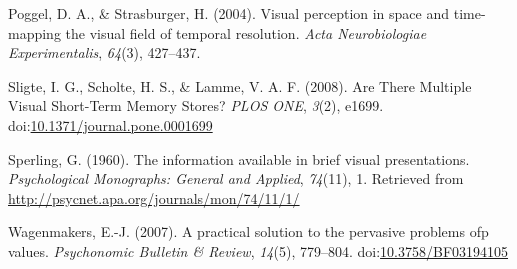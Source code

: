 \documentclass[,man]{apa6}
\theoremstyle{definition}
\theoremstyle{definition}
\theoremstyle{definition}
\theoremstyle{remark}
\begin{document}
\hypertarget{ref-poggel_visual_2004}{}
Poggel, D. A., \& Strasburger, H. (2004). Visual perception in space and
time-mapping the visual field of temporal resolution. \emph{Acta
Neurobiologiae Experimentalis}, \emph{64}(3), 427--437.

\hypertarget{ref-sligte_are_2008}{}
Sligte, I. G., Scholte, H. S., \& Lamme, V. A. F. (2008). Are There
Multiple Visual Short-Term Memory Stores? \emph{PLOS ONE}, \emph{3}(2),
e1699.
doi:\href{https://doi.org/10.1371/journal.pone.0001699}{10.1371/journal.pone.0001699}

\hypertarget{ref-sperling_information_1960}{}
Sperling, G. (1960). The information available in brief visual
presentations. \emph{Psychological Monographs: General and Applied},
\emph{74}(11), 1. Retrieved from
\url{http://psycnet.apa.org/journals/mon/74/11/1/}

\hypertarget{ref-wagenmakers_practical_2007}{}
Wagenmakers, E.-J. (2007). A practical solution to the pervasive
problems ofp values. \emph{Psychonomic Bulletin \& Review},
\emph{14}(5), 779--804.
doi:\href{https://doi.org/10.3758/BF03194105}{10.3758/BF03194105}
\end{document}
